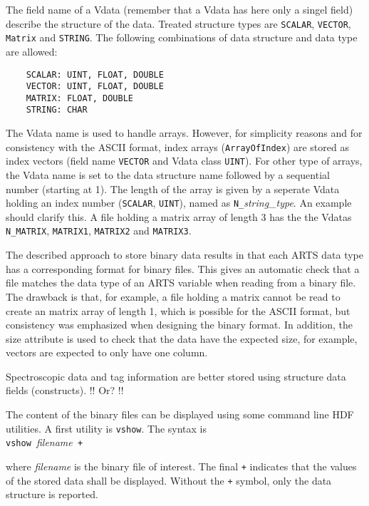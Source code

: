  The field name of a Vdata (remember that a Vdata has here only a
 singel field) describe the structure of the data. Treated structure
 types are \verb|SCALAR|, \verb|VECTOR|, \verb|Matrix| and \verb|STRING|.
 The following combinations of data structure and data type are allowed:
 \begin{verbatim}
    SCALAR: UINT, FLOAT, DOUBLE 
    VECTOR: UINT, FLOAT, DOUBLE 
    MATRIX: FLOAT, DOUBLE 
    STRING: CHAR
 \end{verbatim} 
 The Vdata name is used to handle arrays. However, for simplicity
 reasons and for consistency with the ASCII format, index arrays
 (\verb|ArrayOfIndex|) are stored as index vectors (field name
 \verb|VECTOR| and Vdata class \verb|UINT|). For other type of
 arrays, the Vdata name is set to the data structure name followed
 by a sequential number (starting at 1). The length of the array
 is given by a seperate Vdata holding an index number (\verb|SCALAR|,
 \verb|UINT|), named as \verb|N_|{\it string\_type}. An example should
 clarify this. A file holding a matrix array of length 3 has the
 the Vdatas \verb|N_MATRIX|, \verb|MATRIX1|, \verb|MATRIX2| and
 \verb|MATRIX3|.

 The described approach to store binary data results in that each
 ARTS data type has a corresponding format for binary files. This 
 gives an automatic check that a file matches the data type of
 an ARTS variable when reading from a binary file. The drawback
 is that, for example, a file holding a matrix cannot be read to create
 an matrix array of length 1, which is possible for the ASCII format,
 but consistency was emphasized when designing the binary format.
 In addition, the size attribute is used to check that the data
 have the expected size, for example, vectors are expected to only
 have one column.
 

 \label{sec:formats:file:binary:others}

 Spectroscopic data and tag information are better stored using
 structure data fields (constructs). !! Or? !!


 \label{sec:formats:file:binary:display}

 The content of the binary files can be displayed using some command
 line HDF utilities. A first utility is
 \verb|vshow|. The syntax is \\

 \verb|vshow |{\it filename}\verb| +|

 \noindent
 where {\it filename} is the binary file of interest. The final \verb|+|
 indicates that the values of the stored data shall be displayed. Without
 the \verb|+| symbol, only the data structure is reported.

